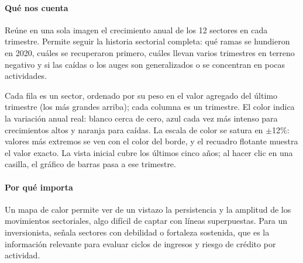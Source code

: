 \paragraph{Qué nos cuenta}
Reúne en una sola imagen el crecimiento anual de los 12 sectores en cada trimestre. Permite seguir la historia sectorial completa: qué ramas se hundieron en 2020, cuáles se recuperaron primero, cuáles llevan varios trimestres en terreno negativo y si las caídas o los auges son generalizados o se concentran en pocas actividades.

\begin{leer}
Cada fila es un sector, ordenado por su peso en el valor agregado del último trimestre (los más grandes arriba); cada columna es un trimestre. El color indica la variación anual real: blanco cerca de cero, azul cada vez más intenso para crecimientos altos y naranja para caídas. La escala de color se satura en $\pm$12\%: valores más extremos se ven con el color del borde, y el recuadro flotante muestra el valor exacto. La vista inicial cubre los últimos cinco años; al hacer clic en una casilla, el gráfico de barras pasa a ese trimestre.
\end{leer}

\paragraph{Por qué importa}
Un mapa de calor permite ver de un vistazo la persistencia y la amplitud de los movimientos sectoriales, algo difícil de captar con líneas superpuestas. Para un inversionista, señala sectores con debilidad o fortaleza sostenida, que es la información relevante para evaluar ciclos de ingresos y riesgo de crédito por actividad.

